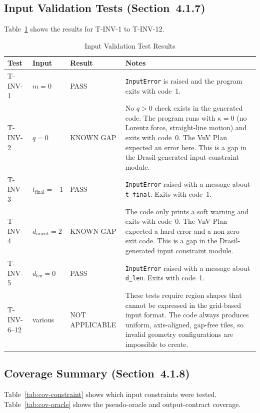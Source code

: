 \documentclass[12pt, titlepage]{article}
\begin{document}
\subsection{Input Validation Tests (Section~4.1.7)}

Table~\ref{tab:inv-results} shows the results for T-INV-1 to T-INV-12.

\begin{table}[h]
\caption{Input Validation Test Results}
\label{tab:inv-results}
\centering
\begin{tabular}{lllp{7cm}}
\toprule
\textbf{Test} & \textbf{Input} & \textbf{Result} & \textbf{Notes} \\
\midrule
T-INV-1 & $m=0$ & PASS &
  \texttt{InputError} is raised and the program exits with code~1. \\
T-INV-2 & $q=0$ & KNOWN GAP &
  No $q>0$ check exists in the generated code.
  The program runs with $\kappa=0$ (no Lorentz force, straight-line
  motion) and exits with code~0.
  The VnV Plan expected an error here.
  This is a gap in the Drasil-generated input constraint module. \\
T-INV-3 & $t_\text{final}=-1$ & PASS &
  \texttt{InputError} raised with a message about \texttt{t\_final}.
  Exits with code~1. \\
T-INV-4 & $d_\text{orient}=2$ & KNOWN GAP &
  The code only prints a soft warning and exits with code~0.
  The VnV Plan expected a hard error and a non-zero exit code.
  This is a gap in the Drasil-generated input constraint module. \\
T-INV-5 & $d_\text{len}=0$ & PASS &
  \texttt{InputError} raised with a message about \texttt{d\_len}.
  Exits with code~1. \\
T-INV-6--12 & various & NOT APPLICABLE &
  These tests require region shapes that cannot be expressed in the
  grid-based input format.
  The code always produces uniform, axis-aligned, gap-free tiles,
  so invalid geometry configurations are impossible to create. \\
\bottomrule
\end{tabular}
\end{table}

\subsection{Coverage Summary (Section~4.1.8)}

Table~\ref{tab:cov-constraint} shows which input constraints were tested.
Table~\ref{tab:cov-oracle} shows the pseudo-oracle and output-contract
coverage.
\end{document}
